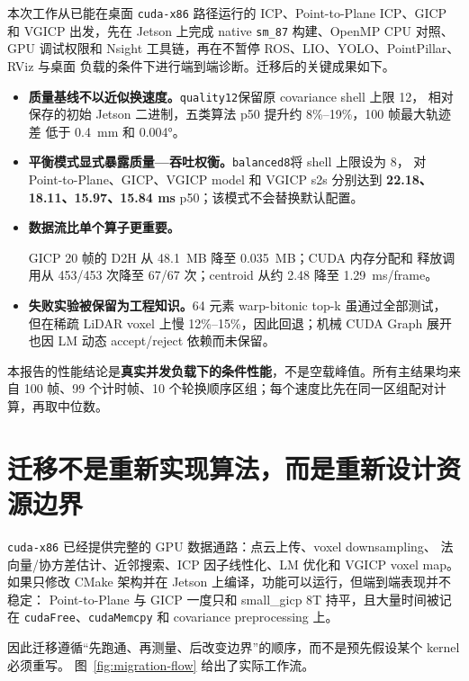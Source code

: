 \documentclass[UTF8,a4paper,11pt,fontset=none]{ctexart}
\newcommand{\metric}[1]{\textbf{\color{ReportBlue}#1}}
\newcommand{\profilequality}{\texttt{quality12}}
\newcommand{\profilebalanced}{\texttt{balanced8}}
\begin{document}
本次工作从已能在桌面 \texttt{cuda-x86} 路径运行的 ICP、Point-to-Plane ICP、GICP
和 VGICP 出发，先在 Jetson 上完成 native \texttt{sm\_87} 构建、OpenMP CPU 对照、
GPU 调试权限和 Nsight 工具链，再在不暂停 ROS、LIO、YOLO、PointPillar、RViz 与桌面
负载的条件下进行端到端诊断。迁移后的关键成果如下。

\begin{itemize}
  \item \textbf{质量基线不以近似换速度。}\profilequality 保留原 covariance shell 上限 12，
        相对保存的初始 Jetson 二进制，五类算法 p50 提升约 8\%--19\%，100 帧最大轨迹差
        低于 \SI{0.4}{\milli\metre} 和 \ang{0.004}。
  \item \textbf{平衡模式显式暴露质量---吞吐权衡。}\profilebalanced 将 shell 上限设为 8，
        对 Point-to-Plane、GICP、VGICP model 和 VGICP s2s 分别达到
        \metric{22.18、18.11、15.97、15.84 ms} p50；该模式不会替换默认配置。
  \item \textbf{数据流比单个算子更重要。}\par
        GICP 20 帧的 D2H 从 \SI{48.1}{MB} 降至 \SI{0.035}{MB}；CUDA 内存分配和
        释放调用从 453/453 次降至 67/67 次；centroid 从约 2.48 降至
        \SI{1.29}{ms/frame}。
  \item \textbf{失败实验被保留为工程知识。}64 元素 warp-bitonic top-k 虽通过全部测试，
        但在稀疏 LiDAR voxel 上慢 12\%--15\%，因此回退；机械 CUDA Graph 展开也因
        LM 动态 accept/reject 依赖而未保留。
\end{itemize}

本报告的性能结论是\textbf{真实并发负载下的条件性能}，不是空载峰值。所有主结果均来自
100 帧、99 个计时帧、10 个轮换顺序区组；每个速度比先在同一区组配对计算，再取中位数。

\section{迁移不是重新实现算法，而是重新设计资源边界}

\texttt{cuda-x86} 已经提供完整的 GPU 数据通路：点云上传、voxel downsampling、
法向量/协方差估计、近邻搜索、ICP 因子线性化、LM 优化和 VGICP voxel map。
如果只修改 CMake 架构并在 Jetson 上编译，功能可以运行，但端到端表现并不稳定：
Point-to-Plane 与 GICP 一度只和 small\_gicp 8T 持平，且大量时间被记在
\texttt{cudaFree}、\texttt{cudaMemcpy} 和 covariance preprocessing 上。

因此迁移遵循“先跑通、再测量、后改变边界”的顺序，而不是预先假设某个 kernel 必须重写。
图~\ref{fig:migration-flow} 给出了实际工作流。
\end{document}
